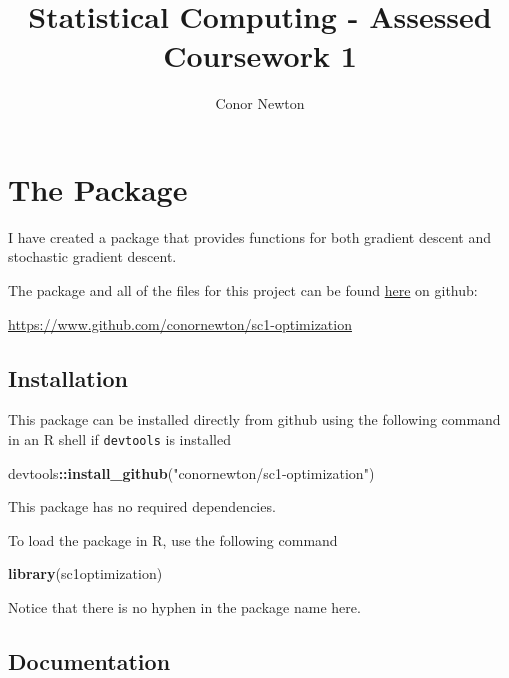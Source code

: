 \documentclass[12pt,]{article}
\title{Statistical Computing - Assessed Coursework 1}
\author{Conor Newton}
\date{}
\newenvironment{Shaded}{\begin{snugshade}}{\end{snugshade}}
\newcommand{\KeywordTok}[1]{\textcolor[rgb]{0.13,0.29,0.53}{\textbf{#1}}}
\newcommand{\NormalTok}[1]{#1}
\newcommand{\OperatorTok}[1]{\textcolor[rgb]{0.81,0.36,0.00}{\textbf{#1}}}
\newcommand{\StringTok}[1]{\textcolor[rgb]{0.31,0.60,0.02}{#1}}
\begin{document}
\maketitle

{
\setcounter{tocdepth}{3}
\tableofcontents
}
\newpage

\hypertarget{the-package}{%
\section{The Package}\label{the-package}}

I have created a package that provides functions for both gradient
descent and stochastic gradient descent.

The package and all of the files for this project can be found
\href{https://www.github.com/conornewton/sc1-optimization}{here} on
github:

\url{https://www.github.com/conornewton/sc1-optimization}

\hypertarget{installation}{%
\subsection{Installation}\label{installation}}

This package can be installed directly from github using the following
command in an R shell if \texttt{devtools} is installed

\begin{Shaded}
\begin{Highlighting}[]
\NormalTok{    devtools}\OperatorTok{::}\KeywordTok{install_github}\NormalTok{(}\StringTok{"conornewton/sc1-optimization"}\NormalTok{)}
\end{Highlighting}
\end{Shaded}

This package has no required dependencies.

To load the package in R, use the following command

\begin{Shaded}
\begin{Highlighting}[]
    \KeywordTok{library}\NormalTok{(sc1optimization)}
\end{Highlighting}
\end{Shaded}

Notice that there is no hyphen in the package name here.

\hypertarget{documentation}{%
\subsection{Documentation}\label{documentation}}
\end{document}
